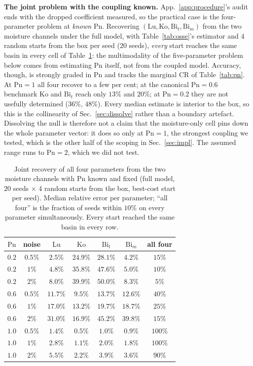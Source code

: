 \documentclass{article}
\begin{document}
\textbf{The joint problem with the coupling known.} App.~\ref{app:procedure}'s audit ends with the
dropped coefficient measured, so the practical case is the four-parameter problem at \emph{known}
$\mathrm{Pn}$. Recovering $(\mathrm{Lu},\mathrm{Ko},\mathrm{Bi}_t,\mathrm{Bi}_m)$ from the two
moisture channels under the full model, with Table~\ref{tab:osse}'s estimator and $4$ random starts
from the box per seed ($20$ seeds), \emph{every} start reaches the same basin in every cell of
Table~\ref{tab:joint4}: the multimodality of the five-parameter problem below comes from estimating
$\mathrm{Pn}$ itself, not from the coupled model. Accuracy, though, is strongly graded in
$\mathrm{Pn}$ and tracks the marginal CR of Table~\ref{tab:pn}. At $\mathrm{Pn}{=}1$ all four recover
to a few per cent; at the canonical $\mathrm{Pn}{=}0.6$ benchmark $\mathrm{Ko}$ and $\mathrm{Bi}_t$
reach only $13\%$ and $20\%$; at $\mathrm{Pn}{=}0.2$ they are not usefully determined ($36\%$,
$48\%$). Every median estimate is interior to the box, so this is the collinearity of
Sec.~\ref{sec:dissolve} rather than a boundary artefact. Dissolving the null is therefore not a claim
that the moisture-only cell pins down the whole parameter vector: it does so only at
$\mathrm{Pn}{=}1$, the strongest coupling we tested, which is the other half of the scoping in
Sec.~\ref{sec:impl}. The assumed range runs to $\mathrm{Pn}{=}2$, which we did not test.

\begin{table}[h]\centering\footnotesize
\setlength{\tabcolsep}{5pt}
\caption{Joint recovery of all four parameters from the two moisture channels with $\mathrm{Pn}$
known and fixed (full model, $20$ seeds $\times$ $4$ random starts from the box, best-cost start per
seed). Median relative error per parameter; ``all four'' is the fraction of seeds within $10\%$ on
every parameter simultaneously. Every start reached the same basin in every row.}
\label{tab:joint4}
\begin{tabular}{ccccccc}\toprule
$\mathrm{Pn}$ & noise & $\mathrm{Lu}$ & $\mathrm{Ko}$ & $\mathrm{Bi}_t$ & $\mathrm{Bi}_m$ & all four\\\midrule
$0.2$ & $0.5\%$ & $2.5\%$ & $24.9\%$ & $28.1\%$ & $4.2\%$ & $15\%$\\
$0.2$ & $1\%$   & $4.8\%$ & $35.8\%$ & $47.6\%$ & $5.0\%$ & $10\%$\\
$0.2$ & $2\%$   & $8.0\%$ & $39.9\%$ & $50.0\%$ & $8.3\%$ & $5\%$\\\midrule
$0.6$ & $0.5\%$ & $11.7\%$ & $9.5\%$ & $13.7\%$ & $12.6\%$ & $40\%$\\
$0.6$ & $1\%$   & $17.0\%$ & $13.2\%$ & $19.7\%$ & $18.7\%$ & $25\%$\\
$0.6$ & $2\%$   & $31.0\%$ & $16.9\%$ & $45.2\%$ & $39.8\%$ & $15\%$\\\midrule
$1.0$ & $0.5\%$ & $1.4\%$ & $0.5\%$ & $1.0\%$ & $0.9\%$ & $100\%$\\
$1.0$ & $1\%$   & $2.8\%$ & $1.1\%$ & $2.0\%$ & $1.8\%$ & $100\%$\\
$1.0$ & $2\%$   & $5.5\%$ & $2.2\%$ & $3.9\%$ & $3.6\%$ & $90\%$\\
\bottomrule\end{tabular}
\end{table}
\end{document}
